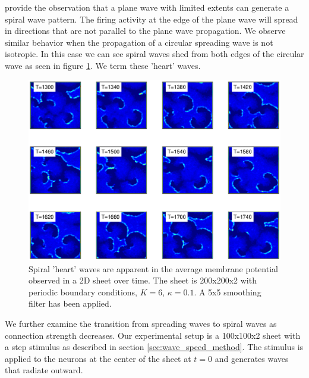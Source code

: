 \citet{Huang2010} provide the observation that a plane wave with limited extents can generate a spiral wave pattern.
The firing activity at the edge of the plane wave will spread in directions that are not parallel to the plane wave propagation.
We observe similar behavior when the propagation of a circular spreading wave is not isotropic.
In this case we can see spiral waves shed from both edges of the circular wave as seen in figure \ref{fig:2DHeartWaves}.
We term these 'heart' waves.
\begin{figure}[!htb]
 \caption{ Spiral 'heart' waves are apparent in the average membrane potential observed in a 2D sheet over time. 
           The sheet is 200x200x2 with periodic boundary conditions, $K=6$, $\kappa=0.1$.
           A 5x5 smoothing filter has been applied. }
 \label{fig:2DHeartWaves}
 \centering
   \includegraphics[width=\textwidth]{fig/2DSpiralWaves_HeartWaves}
\end{figure}
\FloatBarrier

We further examine the transition from spreading waves to spiral waves as connection strength decreases.
Our experimental setup is a 100x100x2 sheet with a step stimulus as described in section \ref{sec:wave_speed_method}.
The stimulus is applied to the neurons at the center of the sheet at $t=0$ and generates waves that radiate outward.


